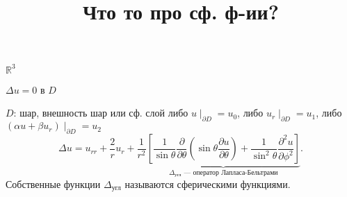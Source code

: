 \documentclass[a4paper]{article}
\title{Что то про сф. ф-ии?}
\begin{document}
	\maketitle
    $\mathbb{R}^3$

    $\Delta u = 0 $ в $D$ 

    $D$: шар, внешность шар или сф. слой
    либо $u \mid _{\partial D}= u_0$, либо $u_r \mid _{\partial D}=u_1$, либо $(\alpha u +\beta u_r)\mid _{\partial D}=u_2$
   \[
   \Delta u = u_{rr}+ \frac{2}{r} u_r+ \frac{1}{r^2}\underbrace{\left[ 
   \frac{1}{\sin \theta} \frac{\partial }{\partial \theta} \left( 
   \sin \theta \frac{\partial u}{\partial \theta} \right) +
   \frac{1}{\sin^2 \theta} \frac{\partial ^2u}{\partial \phi^2} \right]}_{\Delta _{\text{угл}} \text{ --- оператор Лапласа-Бельтрами}} 
   .\] 
   Собственные функции $\Delta_\text{угл}$ называются сферическими
   функциями.
\end{document}
